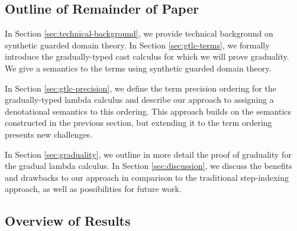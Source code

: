 \subsection{Outline of Remainder of Paper}

%
In Section \ref{sec:technical-background}, we provide technical background on synthetic guarded domain theory.
% 
In Section \ref{sec:gtlc-terms}, we formally introduce the gradually-typed cast calculus
for which we will prove graduality. We give a semantics to the terms using
synthetic guarded domain theory.
%

In Section \ref{sec:gtlc-precision}, we define the term precision ordering for
the gradually-typed lambda calculus and describe our approach to assigning a
denotational semantics to this ordering.
This approach builds on the semantics constructed in the previous section,
but extending it to the term ordering presents new challenges.


%
%
In Section \ref{sec:graduality}, we outline in more detail the proof of graduality for the
gradual lambda calculus.
%
In Section \ref{sec:discussion}, we discuss the benefits and drawbacks to our approach in comparison
to the traditional step-indexing approach, as well as possibilities for future work.

\subsection{Overview of Results}\label{sec:overview}


